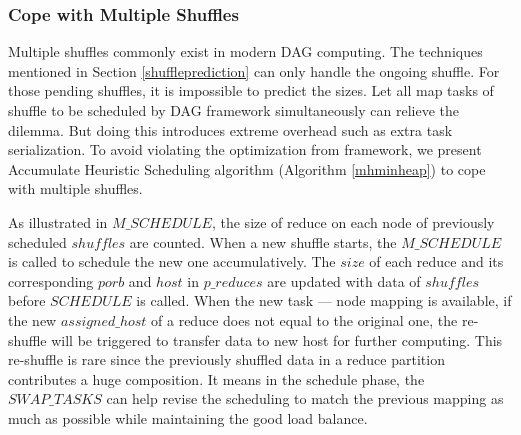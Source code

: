 \subsubsection{Cope with Multiple Shuffles}
Multiple shuffles commonly exist in modern DAG computing. The techniques mentioned in Section \ref{shuffleprediction} can only handle the ongoing shuffle. For those pending shuffles, it is impossible to predict the sizes. Let all map tasks of shuffle to be scheduled by DAG framework simultaneously can relieve the dilemma. But doing this introduces extreme overhead such as extra task serialization. To avoid violating the optimization from framework, we present Accumulate Heuristic Scheduling algorithm (Algorithm \ref{mhminheap}) to cope with multiple shuffles.

As illustrated in $M\_SCHEDULE$, the size of reduce on each node of previously scheduled $shuffles$ are counted. When a new shuffle starts, the $M\_SCHEDULE$ is called to schedule the new one accumulatively. The $size$ of each reduce and its corresponding $porb$ and $host$ in $p\_reduces$ are updated with data of $shuffles$ before $SCHEDULE$ is called. When the new task --- node mapping is available, if the new $assigned\_host$ of a reduce does not equal to the original one, the re-shuffle will be triggered to transfer data to new host for further computing. This re-shuffle is rare since the previously shuffled data in a reduce partition contributes a huge composition. It means in the schedule phase, the $SWAP\_TASKS$ can help revise the scheduling to match the previous mapping as much as possible while maintaining the good load balance.


